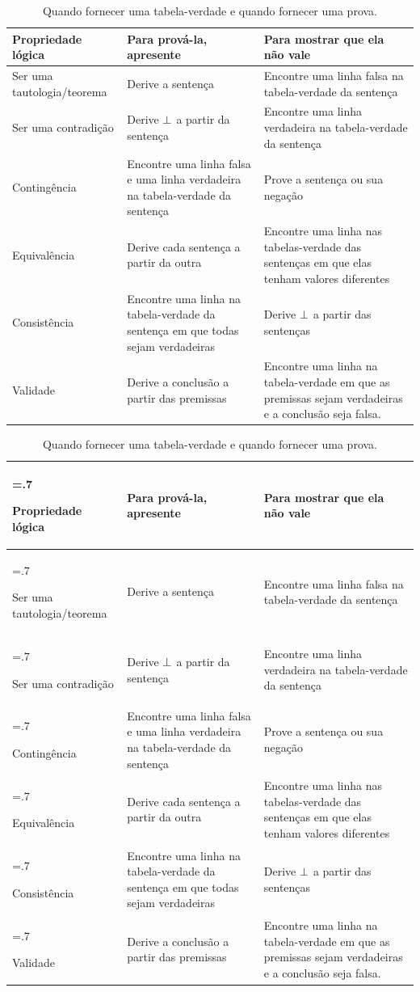 \def\tmptable{\textbf{Propriedade lógica} 	&	\textbf{Para prová-la, apresente} 	&	\textbf{Para mostrar que ela não vale} \\ \hline \hline
Ser uma tautologia/teorema 		& Derive a sentença 						& Encontre uma linha falsa na tabela-verdade da sentença \\ \hline
Ser uma contradição 	& Derive $\ered$ a partir da sentença 		 & Encontre uma linha verdadeira na tabela-verdade da sentença\\ \hline
Contingência 			& Encontre uma linha falsa e uma linha verdadeira na tabela-verdade da sentença & Prove a sentença ou sua negação\\ \hline
Equivalência 			& Derive cada sentença a partir da outra 		 & Encontre uma linha nas tabelas-verdade das sentenças em que elas tenham valores diferentes\\ \hline
Consistência 		& Encontre uma linha na tabela-verdade da sentença em que todas sejam verdadeiras & Derive $\ered$ a partir das sentenças\\ \hline
Validade 				& Derive a conclusão a partir das premissas & Encontre uma linha na tabela-verdade em que as premissas sejam verdadeiras e a conclusão seja falsa. \\ }

\ifHTMLtarget
\begin{table}
\begin{tabularx}{\textwidth}{X||X|X}
\tmptable
\end{tabularx}
\caption{Quando fornecer uma tabela-verdade e quando fornecer uma prova.}
\label{table.ProofOrModel}
\end{table}
\else
\begin{table}\small
\begin{tabularx}{\textwidth}{>{\hsize=.7\hsize\raggedright\arraybackslash}X||X|X}
\tmptable
\end{tabularx}
\caption{Quando fornecer uma tabela-verdade e quando fornecer uma prova.}
\label{table.ProofOrModel}
\end{table}
\fi



